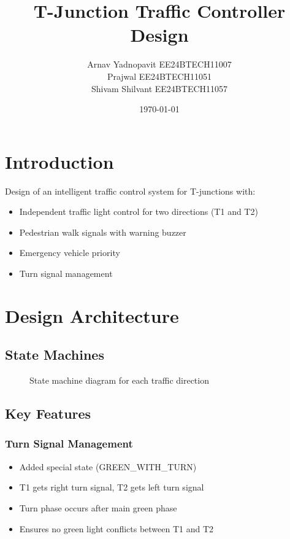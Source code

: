 \documentclass{article}
\title{T-Junction Traffic Controller Design}
\author{Arnav Yadnopavit EE24BTECH11007\\Prajwal EE24BTECH11051\\Shivam Shilvant EE24BTECH11057}
\date{\today}
\begin{document}
\maketitle

\section{Introduction}
Design of an intelligent traffic control system for T-junctions with:
\begin{itemize}
    \item Independent traffic light control for two directions (T1 and T2)
    \item Pedestrian walk signals with warning buzzer
    \item Emergency vehicle priority
    \item Turn signal management
\end{itemize}

\section{Design Architecture}

\subsection{State Machines}
\begin{figure}[h]
\centering
{}
\caption{State machine diagram for each traffic direction}
\end{figure}

\subsection{Key Features}

\subsubsection{Turn Signal Management}
\begin{itemize}
    \item Added special state (GREEN\_WITH\_TURN)
    \item T1 gets right turn signal, T2 gets left turn signal
    \item Turn phase occurs after main green phase
    \item Ensures no green light conflicts between T1 and T2
\end{itemize}
\end{document}
